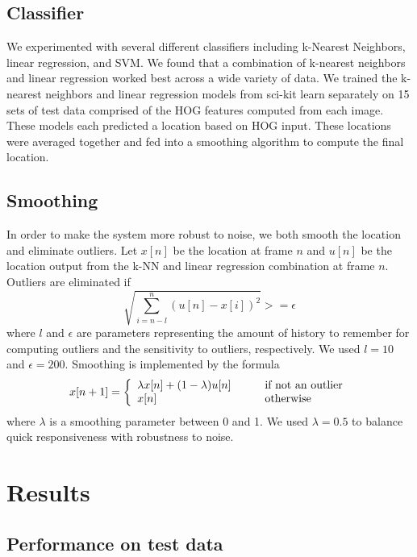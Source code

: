 \documentclass[10pt,twocolumn,letterpaper]{article}
\begin{document}

\subsection{Classifier}
We experimented with several different classifiers including k-Nearest Neighbors, linear regression, and SVM. We found that a combination of k-nearest neighbors and linear regression worked best across a wide variety of data. We trained the k-nearest neighbors and linear regression models from sci-kit learn separately on 15 sets of test data comprised of the HOG features computed from each image. These models each predicted a location based on HOG input. These locations were averaged together and fed into a smoothing algorithm to compute the final location.

\subsection{Smoothing}
In order to make the system more robust to noise, we both smooth the location and eliminate outliers. Let $x[n]$ be the location at frame $n$ and $u[n]$ be the location output from the k-NN and linear regression combination at frame $n$. Outliers are eliminated if
\begin{equation}
	\sqrt{\sum_{i=n-l}^{n}(u[n]-x[i])^2} >= \epsilon
\end{equation}
where $l$ and $\epsilon$ are parameters representing the amount of history to remember for computing outliers and the sensitivity to outliers, respectively. We used $l=10$ and $\epsilon=200$. Smoothing is implemented by the formula 
\begin{equation}
	x[n+1] = \left\{
		\begin{array}{l l}
			\lambda x[n] + (1-\lambda)u[n] & \qquad \text{if not an outlier} \\
			x[n] & \qquad \text{otherwise}
		\end{array}
	\right.
\end{equation}
 where $\lambda$ is a smoothing parameter between 0 and 1. We used $\lambda=0.5$ to balance quick responsiveness with robustness to noise.

\section{Results}

\subsection{Performance on test data}
\end{document}
